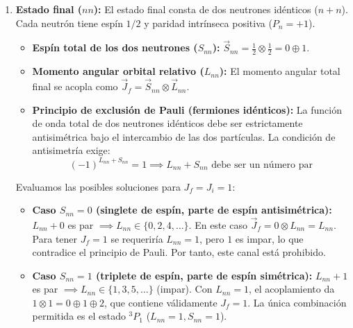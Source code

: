 \begin{problema}
\begin{enumerate}[label=\arabic*.]
    El momento angular total inicial $J_i$ es:
    \begin{equation*}
        \vec{J}_i = \vec{J}_\pi \otimes \vec{J}_d \otimes \vec{L}_{\pi d} = 0 \otimes 1 \otimes 0 \implies J_i = 1
    \end{equation*}
    
    La paridad total del estado inicial $P_i$ es:
    \begin{equation*}
        P_i = P_{\pi^-} \cdot P_d \cdot (-1)^{L_{\pi d}} = P_{\pi^-} \cdot (+1) \cdot (-1)^0 = P_{\pi^-}
    \end{equation*}

    \item \textbf{Estado final ($nn$):}
    El estado final consta de dos neutrones idénticos ($n+n$). Cada neutrón tiene espín $1/2$ y paridad intrínseca positiva ($P_n = +1$).
    
    \begin{itemize}
        \item \textbf{Espín total de los dos neutrones ($S_{nn}$):} $\vec{S}_{nn} = \frac{1}{2} \otimes \frac{1}{2} = 0 \oplus 1$.
        \item \textbf{Momento angular orbital relativo ($L_{nn}$):} El momento angular total final se acopla como $\vec{J}_f = \vec{S}_{nn} \otimes \vec{L}_{nn}$.
        \item \textbf{Principio de exclusión de Pauli (fermiones idénticos):} La función de onda total de dos neutrones idénticos debe ser estrictamente antisimétrica bajo el intercambio de las dos partículas. La condición de antisimetría exige:
        \begin{equation*}
            (-1)^{L_{nn} + S_{nn}} = 1 \implies L_{nn} + S_{nn} \text{ debe ser un número par}
        \end{equation*}
    \end{itemize}

    Evaluamos las posibles soluciones para $J_f = J_i = 1$:
    \begin{itemize}
        \item \textbf{Caso $S_{nn} = 0$ (singlete de espín, parte de espín antisimétrica):}
        $L_{nn} + 0$ es par $\implies L_{nn} \in \{0, 2, 4, \dots\}$. En este caso $\vec{J}_f = 0 \otimes L_{nn} = L_{nn}$. Para tener $J_f = 1$ se requeriría $L_{nn} = 1$, pero $1$ es impar, lo que contradice el principio de Pauli. Por tanto, este canal está prohibido.
        \item \textbf{Caso $S_{nn} = 1$ (triplete de espín, parte de espín simétrica):}
        $L_{nn} + 1$ es par $\implies L_{nn} \in \{1, 3, 5, \dots\}$ (impar). Con $L_{nn} = 1$, el acoplamiento da $1 \otimes 1 = 0 \oplus 1 \oplus 2$, que contiene válidamente $J_f = 1$. La única combinación permitida es el estado \textbf{$^3P_1$} ($L_{nn} = 1, S_{nn} = 1$).
    \end{itemize}


\end{enumerate}
\end{problema}

